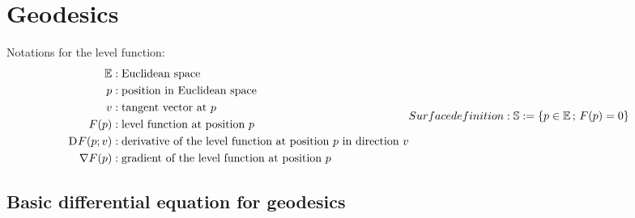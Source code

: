 \section{Geodesics}


Notations for the level function:
\begin{subequations}
\begin{align}
\mathbb{ E }  &:  \text{Euclidean space}\\
p  &:  \text{position in Euclidean space}\\
v  &:  \text{tangent vector at $ p $}\\
F( p )  &:  \text{level function at position $ p $}\\
\diff{}{ F }( p; v )  &:  \text{derivative of the level function at position $ p $ in direction $ v $}\\
\grad{ F }( p )  &:  \text{gradient of the level function at position $ p $}
\end{align}
Surface definition:
\begin{align}
\mathbb{ S }  &:=  \{ p \in \mathbb{ E } \,;\, F( p )  = 0 \}
\end{align}
\end{subequations}



\subsection{Basic differential equation for geodesics}



